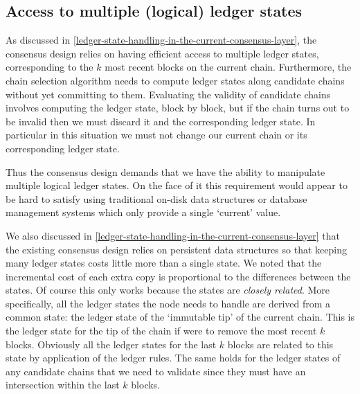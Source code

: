 \documentclass[11pt,a4paper]{article}
\begin{document}
\subsection{Access to multiple (logical) ledger states}
\label{access-to-multiple-logical-ledger-states}

As discussed in \cref{ledger-state-handling-in-the-current-consensus-layer},
the consensus design relies on having efficient access to multiple ledger
states, corresponding to the $k$ most recent blocks on the current chain.
Furthermore, the chain selection algorithm needs to compute ledger states along
candidate chains without yet committing to them. Evaluating the validity of
candidate chains involves computing the ledger state, block by block, but if
the chain turns out to be invalid then we must discard it and the corresponding
ledger state. In particular in this situation we must not change our current
chain or its corresponding ledger state.

Thus the consensus design demands that we have the ability to manipulate
multiple logical ledger states. On the face of it this requirement would appear
to be hard to satisfy using traditional on-disk data structures or database
management systems which only provide a single `current' value.

We also discussed in \cref{ledger-state-handling-in-the-current-consensus-layer}
that the existing consensus design relies on persistent data structures so that
keeping many ledger states costs little more than a single state. We noted that
the incremental cost of each extra copy is proportional to the differences
between the states. Of course this only works because the states are
\emph{closely related}. More specifically, all the ledger states the node needs
to handle are derived from a common state: the ledger state of the `immutable
tip' of the current chain. This is the ledger state for the tip of the chain if
were to remove the most recent $k$ blocks. Obviously all the ledger states for
the last $k$ blocks are related to this state by application of the ledger
rules. The same holds for the ledger states of any candidate chains that we
need to validate since they must have an intersection within the last $k$
blocks.
\end{document}
